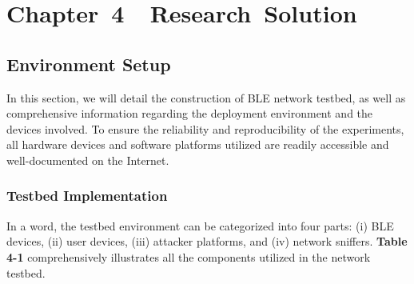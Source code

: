 \section*{Chapter~4~~Research~Solution}
\setcounter{section}{4} \setcounter{subsection}{0} 
\setcounter{table}{0} \setcounter{figure}{0} \setcounter{equation}{0}\setcounter{definition}{0}

\subsection{Environment Setup}
\noindent In this section, we will detail the construction of BLE network testbed, as well as comprehensive information regarding the deployment environment and the devices involved. To ensure the reliability and reproducibility of the experiments, all hardware devices and software platforms utilized are readily accessible and well-documented on the Internet.

\subsubsection{Testbed Implementation}

\noindent In a word, the testbed environment can be categorized into four parts: (i) BLE devices, (ii) user devices, (iii) attacker platforms, and (iv) network sniffers. \textbf{Table 4-1} comprehensively illustrates all the components utilized in the network testbed.

\begin{table}[H]
    \centering
    \caption{Components of proposed BLE network testbed.}
    \renewcommand\arraystretch{1.2}
    
\end{table}

